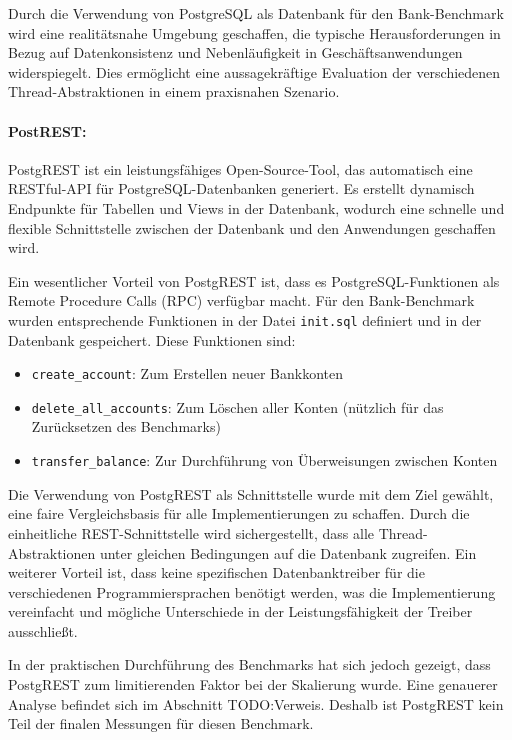 \documentclass[fontsize=12pt,paper=a4,twoside=semi,parskip=half-,headsepline,headinclude]{scrreprt}
\begin{document}
Durch die Verwendung von PostgreSQL als Datenbank für den Bank-Benchmark wird eine realitätsnahe Umgebung geschaffen, die typische Herausforderungen in Bezug auf Datenkonsistenz und Nebenläufigkeit in Geschäftsanwendungen widerspiegelt. Dies ermöglicht eine aussagekräftige Evaluation der verschiedenen Thread-Abstraktionen in einem praxisnahen Szenario.

\paragraph{PostREST:}

PostgREST ist ein leistungsfähiges Open-Source-Tool, das automatisch eine RESTful-API für PostgreSQL-Datenbanken generiert. Es erstellt dynamisch Endpunkte für Tabellen und Views in der Datenbank, wodurch eine schnelle und flexible Schnittstelle zwischen der Datenbank und den Anwendungen geschaffen wird.

Ein wesentlicher Vorteil von PostgREST ist, dass es PostgreSQL-Funktionen als Remote Procedure Calls (RPC) verfügbar macht. Für den Bank-Benchmark wurden entsprechende Funktionen in der Datei \texttt{init.sql} definiert und in der Datenbank gespeichert. Diese Funktionen sind:

\begin{itemize}
	\item \texttt{create\_account}: Zum Erstellen neuer Bankkonten
	\item \texttt{delete\_all\_accounts}: Zum Löschen aller Konten (nützlich für das Zurücksetzen des Benchmarks)
	\item \texttt{transfer\_balance}: Zur Durchführung von Überweisungen zwischen Konten
\end{itemize}

Die Verwendung von PostgREST als Schnittstelle wurde mit dem Ziel gewählt, eine faire Vergleichsbasis für alle Implementierungen zu schaffen. Durch die einheitliche REST-Schnittstelle wird sichergestellt, dass alle Thread-Abstraktionen unter gleichen Bedingungen auf die Datenbank zugreifen. Ein weiterer Vorteil ist, dass keine spezifischen Datenbanktreiber für die verschiedenen Programmiersprachen benötigt werden, was die Implementierung vereinfacht und mögliche Unterschiede in der Leistungsfähigkeit der Treiber ausschließt.

In der praktischen Durchführung des Benchmarks hat sich jedoch gezeigt, dass PostgREST zum limitierenden Faktor bei der Skalierung wurde. Eine genauerer Analyse befindet sich im Abschnitt TODO:Verweis. Deshalb ist PostgREST kein Teil der finalen Messungen für diesen Benchmark.
\end{document}
